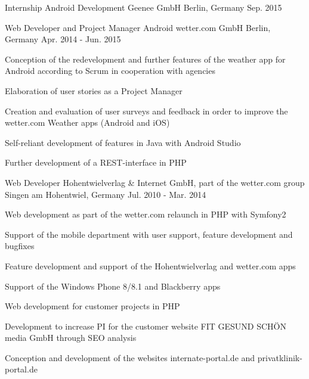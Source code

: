 \begin{cventries}
  \cventry
    {Internship Android Development} %
    {Geenee GmbH} %
    {Berlin, Germany} %
    {Sep. 2015} %
    {}

  \cventry
    {Web Developer and Project Manager Android} %
    {wetter.com GmbH} %
    {Berlin, Germany} %
    {Apr. 2014 - Jun. 2015} %
    {
      \begin{cvitems} %
        \item {Conception of the redevelopment and further features of the weather app for Android according to Scrum in cooperation with agencies}
        \item {Elaboration of user stories as a Project Manager}
        \item {Creation and evaluation of user surveys and feedback in order to improve the wetter.com Weather apps (Android and iOS)}
        \item {Self-reliant development of features in Java with Android Studio}
        \item {Further development of a REST-interface in PHP}
      \end{cvitems}
    }

  \cventry
    {Web Developer} %
    {Hohentwielverlag \& Internet GmbH, part of the wetter.com group} %
    {Singen am Hohentwiel, Germany} %
    {Jul. 2010 - Mar. 2014} %
    {
      \begin{cvitems} %
        \item {Web development as part of the wetter.com relaunch in PHP with Symfony2}
        \item {Support of the mobile department with user support, feature development and bugfixes}
        \item {Feature development and support of the Hohentwielverlag and wetter.com apps}
        \item {Support of the Windows Phone 8/8.1 and Blackberry apps}
        \item {Web development for customer projects in PHP}
        \item {Development to increase PI for the customer website FIT GESUND SCHÖN media GmbH through SEO analysis}
        \item {Conception and development of the websites internate-portal.de and privatklinik-portal.de}
      \end{cvitems}
    }
    

\end{cventries}
